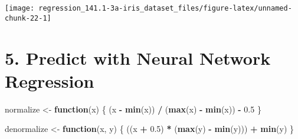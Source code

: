 \documentclass[]{book}
\newenvironment{Shaded}{\begin{snugshade}}{\end{snugshade}}
\newcommand{\CommentTok}[1]{\textcolor[rgb]{0.56,0.35,0.01}{\textit{#1}}}
\newcommand{\ControlFlowTok}[1]{\textcolor[rgb]{0.13,0.29,0.53}{\textbf{#1}}}
\newcommand{\DataTypeTok}[1]{\textcolor[rgb]{0.13,0.29,0.53}{#1}}
\newcommand{\DecValTok}[1]{\textcolor[rgb]{0.00,0.00,0.81}{#1}}
\newcommand{\FloatTok}[1]{\textcolor[rgb]{0.00,0.00,0.81}{#1}}
\newcommand{\KeywordTok}[1]{\textcolor[rgb]{0.13,0.29,0.53}{\textbf{#1}}}
\newcommand{\NormalTok}[1]{#1}
\newcommand{\OperatorTok}[1]{\textcolor[rgb]{0.81,0.36,0.00}{\textbf{#1}}}
\newcommand{\StringTok}[1]{\textcolor[rgb]{0.31,0.60,0.02}{#1}}
\begin{document}
\begin{center}\texttt{[image: regression\_141.1-3a-iris\_dataset\_files/figure-latex/unnamed-chunk-22-1]} \end{center}

\begin{Shaded}
\end{Shaded}

\hypertarget{predict-with-neural-network-regression}{%
\section{5. Predict with Neural Network Regression}\label{predict-with-neural-network-regression}}

\begin{Shaded}
\begin{Highlighting}[]
\NormalTok{normalize <-}\StringTok{ }\ControlFlowTok{function}\NormalTok{(x) \{}
\NormalTok{  (x }\OperatorTok{-}\StringTok{ }\KeywordTok{min}\NormalTok{(x)) }\OperatorTok{/}\StringTok{ }\NormalTok{(}\KeywordTok{max}\NormalTok{(x) }\OperatorTok{-}\StringTok{ }\KeywordTok{min}\NormalTok{(x)) }\OperatorTok{-}\StringTok{ }\FloatTok{0.5}
\NormalTok{\}}
\end{Highlighting}
\end{Shaded}

\begin{Shaded}
\begin{Highlighting}[]
\NormalTok{denormalize <-}\StringTok{ }\ControlFlowTok{function}\NormalTok{(x, y) \{}
\NormalTok{  ((x }\OperatorTok{+}\StringTok{ }\FloatTok{0.5}\NormalTok{) }\OperatorTok{*}\StringTok{ }\NormalTok{(}\KeywordTok{max}\NormalTok{(y) }\OperatorTok{-}\StringTok{ }\KeywordTok{min}\NormalTok{(y))) }\OperatorTok{+}\StringTok{ }\KeywordTok{min}\NormalTok{(y)}
\NormalTok{\}}
\end{Highlighting}
\end{Shaded}

\begin{Shaded}
\end{Shaded}
\end{document}
